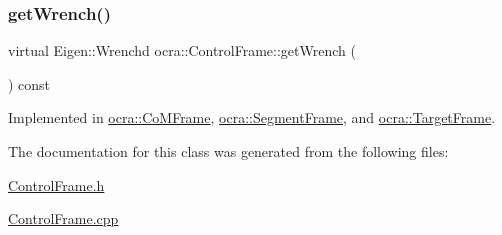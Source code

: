 \hypertarget{classocra_1_1ControlFrame_a069aaf1eab98598fbffee263fcde0c56}{}\label{classocra_1_1ControlFrame_a069aaf1eab98598fbffee263fcde0c56} 
\subsubsection{\texorpdfstring{get\+Wrench()}{getWrench()}}
{\footnotesize\ttfamily virtual Eigen\+::\+Wrenchd ocra\+::\+Control\+Frame\+::get\+Wrench (\begin{DoxyParamCaption}{ }\end{DoxyParamCaption}) const\hspace{0.3cm}{\ttfamily [pure virtual]}}



Implemented in \hyperlink{classocra_1_1CoMFrame_a8e00462bbe13df6f595b7000d44240c6}{ocra\+::\+Co\+M\+Frame}, \hyperlink{classocra_1_1SegmentFrame_a47bebcb9817083395ab034fe8fb72a19}{ocra\+::\+Segment\+Frame}, and \hyperlink{classocra_1_1TargetFrame_a5e9ccc5e2e5ae8e52a37b5810a76115d}{ocra\+::\+Target\+Frame}.



The documentation for this class was generated from the following files\+:\begin{DoxyCompactItemize}
\item 
\hyperlink{ControlFrame_8h}{Control\+Frame.\+h}\item 
\hyperlink{ControlFrame_8cpp}{Control\+Frame.\+cpp}\end{DoxyCompactItemize}
